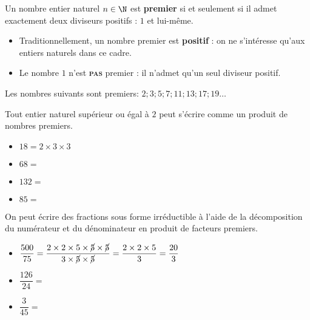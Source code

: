 \documentclass{article}
\begin{document}
\newpage
\begin{tcolorbox}
\begin{definition}
Un nombre entier naturel $n \in \N$ est \textbf{premier} si et seulement si il admet exactement deux diviseurs positifs : $1$ et lui-même. 
\end{definition}
\end{tcolorbox}
\begin{remark}
\hfill
\begin{itemize}
\item Traditionnellement, un nombre premier est \textbf{positif} : on ne s'intéresse qu'aux entiers naturels dans ce cadre.
\item Le nombre $1$ n'est \textbf{\textsc{pas}} premier : il n'admet qu'un seul diviseur positif. 
\end{itemize}
\end{remark}
\begin{example}
Les nombres suivants sont premiers: $2; 3; 5; 7; 11; 13; 17; 19 \dots$
\end{example}
\begin{proposition}
Tout entier naturel supérieur ou égal à $2$ peut s'écrire comme un produit de nombres premiers. 
\end{proposition}
\begin{example}
\hfill
\begin{itemize}
\item $18 = 2 \times 3 \times 3$
\item $68 =$ \answersline 
\item $132 =$ \answersline
\item $85 =$ \answersline
\end{itemize}
\end{example}
\begin{example}
On peut écrire des fractions sous forme irréductible à l'aide de la décomposition du numérateur et du dénominateur en produit de facteurs premiers.
\begin{itemize}
\item $\dfrac{500}{75} = \dfrac{2 \times 2 \times 5 \times \cancel{5} \times \cancel{5}}{3 \times \cancel{5} \times \cancel{5}} = \dfrac{2 \times 2 \times 5}{3} = \dfrac{20}{3}$
\item $\dfrac{126}{24} =$ \answersline
\item $\dfrac{3}{45} =$ \answersline
\end{itemize}
\end{example}
\end{document}

